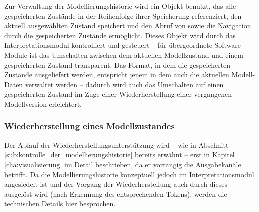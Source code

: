 Zur Verwaltung der Modellierungshistorie wird ein Objekt benutzt, das alle gespeicherten Zustände in der Reihenfolge ihrer Speicherung referenziert, den aktuell ausgewählten Zustand speichert und den Abruf von sowie die Navigation durch die gespeicherten Zustände ermöglicht. Dieses Objekt wird durch das Interpretationsmodul kontrolliert und gesteuert -- für übergeordnete Software-Module ist das Umschalten zwischen dem aktuellen Modellzustand und einem gespeicherten Zustand transparent. Das Format, in dem die gespeicherten Zustände ausgeliefert werden, entspricht jenem in dem auch die aktuellen Modell-Daten verwaltet werden -- dadurch wird auch das Umschalten auf einen gespeicherten Zustand im Zuge einer Wiederherstellung einer vergangenen Modellversion erleichtert.

\subsubsection{Wiederherstellung eines Modellzustandes} %
\label{ssub:wiederherstellung_eines_modellzustandes}

Der Ablauf der Wiederherstellungsunterstützung wird -- wie in Abschnitt \ref{sub:kontrolle_der_modellierungshistorie} bereits erwähnt -- erst in Kapitel \ref{cha:visualisierung} im Detail beschrieben, da er vorrangig die Ausgabekanäle betrifft. Da die Modellierungshistorie konzeptuell jedoch im Interpretationsmodul angesiedelt ist und der Vorgang der Wiederherstellung auch durch dieses ausgelöst wird (nach Erkennung des entsprechenden Tokens), werden die technischen Details hier besprochen. 


